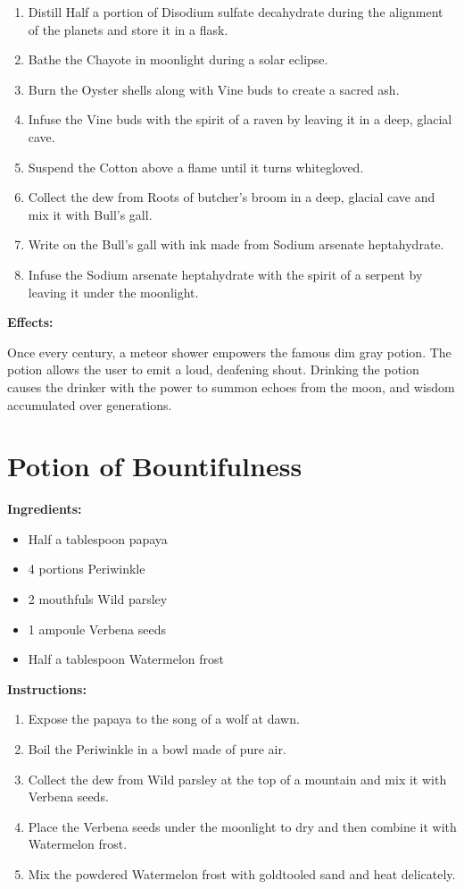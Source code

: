 \documentclass{article}
\begin{document}
\begin{enumerate}
  \item Distill Half a portion of Disodium sulfate decahydrate during the alignment of the planets and store it in a flask.
  \item Bathe the Chayote in moonlight during a solar eclipse.
  \item Burn the Oyster shells along with Vine buds to create a sacred ash.
  \item Infuse the Vine buds with the spirit of a raven by leaving it in a deep, glacial cave.
  \item Suspend the Cotton above a flame until it turns whitegloved.
  \item Collect the dew from Roots of butcher's broom in a deep, glacial cave and mix it with Bull's gall.
  \item Write on the Bull's gall with ink made from Sodium arsenate heptahydrate.
  \item Infuse the Sodium arsenate heptahydrate with the spirit of a serpent by leaving it under the moonlight.
\end{enumerate}

\textbf{Effects:}

Once every century, a meteor shower empowers the famous dim gray potion. The potion allows the user to emit a loud, deafening shout. Drinking the potion causes the drinker with the power to summon echoes from the moon, and wisdom accumulated over generations.

\newpage
\section*{Potion of Bountifulness}

\textbf{Ingredients:}

\begin{itemize}
  \item Half a tablespoon papaya
  \item 4 portions Periwinkle
  \item 2 mouthfuls Wild parsley
  \item 1 ampoule Verbena seeds
  \item Half a tablespoon Watermelon frost
\end{itemize}

\textbf{Instructions:}

\begin{enumerate}
  \item Expose the papaya to the song of a wolf at dawn.
  \item Boil the Periwinkle in a bowl made of pure air.
  \item Collect the dew from Wild parsley at the top of a mountain and mix it with Verbena seeds.
  \item Place the Verbena seeds under the moonlight to dry and then combine it with Watermelon frost.
  \item Mix the powdered Watermelon frost with goldtooled sand and heat delicately.
\end{enumerate}
\end{document}
